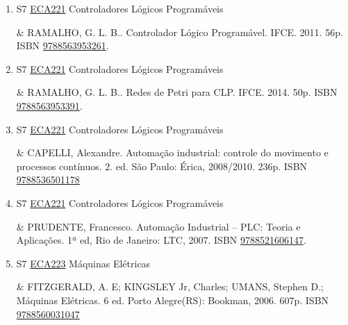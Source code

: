 \documentclass[12pt,a4paper]{book}
\begin{document}
\begin{enumerate}
& GEORGINI, Marcelo.  Automação aplicada: descrição e implementação de sistemas sequenciais com PLCs.  9. ed.  São Paulo (SP): Érica, 2009/2010.  236 p.     ISBN \href{http://www.bn.br/site/pages/servicosProfissionais/agenciaISBN/isbnBusca/FbnBuscaISBNCatalogo.asp?pField=ISBN&pIntPagina=1&pISBN=71947245&nidbISBN=true&hidbISBN=true}{9788571947245}
 

 \item S7 \hyperref[PUD:ECA221]{ECA221} Controladores Lógicos Programáveis

&  RAMALHO, G.  L. B..  Controlador Lógico Programável.  IFCE.  2011.  56p.  ISBN \href{http://www.bn.br/site/pages/servicosProfissionais/agenciaISBN/isbnBusca/FbnBuscaISBNCatalogo.asp?pField=ISBN&pIntPagina=1&pISBN=63953261&nidbISBN=true&hidbISBN=true}{9788563953261}. 
 

 \item S7 \hyperref[PUD:ECA221]{ECA221} Controladores Lógicos Programáveis

&  RAMALHO, G.  L. B..  Redes de Petri para CLP.  IFCE.  2014.  50p.  ISBN \href{http://www.bn.br/site/pages/servicosProfissionais/agenciaISBN/isbnBusca/FbnBuscaISBNCatalogo.asp?pField=ISBN&pIntPagina=1&pISBN=63953391&nidbISBN=true&hidbISBN=true}{9788563953391}. 
 

 \item S7 \hyperref[PUD:ECA221]{ECA221} Controladores Lógicos Programáveis

&  CAPELLI, Alexandre.  Automação industrial: controle do movimento e processos contínuos.  2. ed.  São Paulo: Érica, 2008/2010.  236p.    ISBN \href{http://www.bn.br/site/pages/servicosProfissionais/agenciaISBN/isbnBusca/FbnBuscaISBNCatalogo.asp?pField=ISBN&pIntPagina=1&pISBN=36501178&nidbISBN=true&hidbISBN=true}{9788536501178}
 

 \item S7 \hyperref[PUD:ECA221]{ECA221} Controladores Lógicos Programáveis

&  PRUDENTE, Francesco.  Automação Industrial – PLC: Teoria e Aplicações.  1ª ed, Rio de Janeiro: LTC, 2007.  ISBN \href{http://www.bn.br/site/pages/servicosProfissionais/agenciaISBN/isbnBusca/FbnBuscaISBNCatalogo.asp?pField=ISBN&pIntPagina=1&pISBN=21606147&nidbISBN=true&hidbISBN=true}{9788521606147}.
 \item S7 \hyperref[PUD:ECA223]{ECA223} Máquinas Elétricas

& FITZGERALD, A. E;  KINGSLEY Jr, Charles;  UMANS, Stephen D.;  Máquinas Elétricas.  6 ed.  Porto Alegre(RS): Bookman, 2006.  607p.  ISBN \href{http://www.bn.br/site/pages/servicosProfissionais/agenciaISBN/isbnBusca/FbnBuscaISBNCatalogo.asp?pField=ISBN&pIntPagina=1&pISBN=60031047&nidbISBN=true&hidbISBN=true}{9788560031047}


\end{enumerate}
\end{document}
